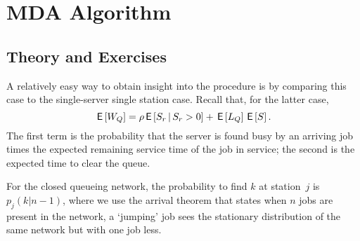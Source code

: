 
\section{MDA Algorithm}
\label{sec:mda}

\subsection*{Theory and Exercises}


A relatively easy way to obtain insight into the procedure is by
comparing this case to the single-server single station case.  Recall that, for the latter case, 
\begin{equation*}
  \,\mathsf{E}\left[W_Q\right] = \rho \,\mathsf{E}\left[S_r\,\middle|\, S_r>0\right] + \,\mathsf{E}\left[L_Q\right] \,\mathsf{E}\left[S\right].
\end{equation*}
The first term is the probability that the server is found busy by an
arriving job times the expected remaining service time of the job in
service; the second is the expected time to clear the queue. 

For the closed queueing network, the probability to find $k$ at
station~$j$ is $p_j(k|n-1)$, where we use the arrival theorem that
states when $n$ jobs are present in the network, a `jumping' job sees
the stationary distribution of the same network but with one job
less. 


